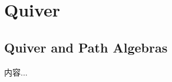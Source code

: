 \documentclass[Total.tex]{subfiles}
\begin{document}
	\chapter{Quiver}
		\section{Quiver and Path Algebras}
		\begin{Def}
			内容...
		\end{Def}
\end{document}
